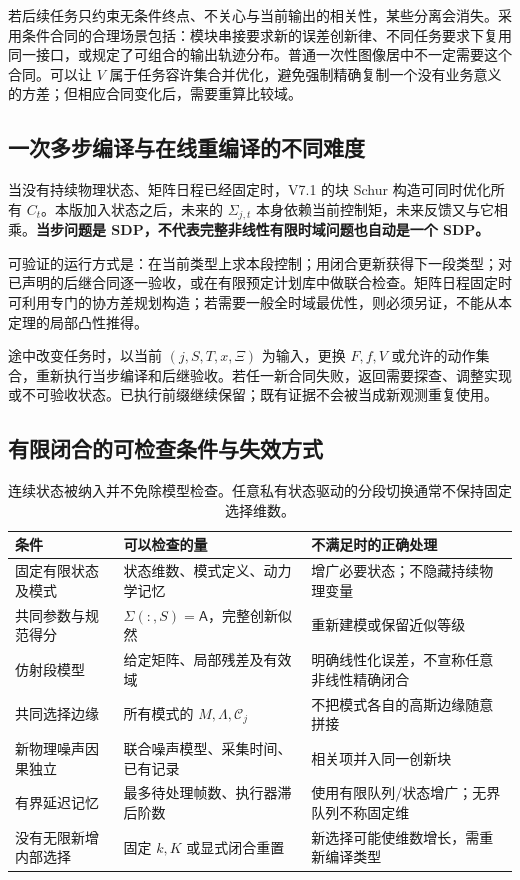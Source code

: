 \documentclass[UTF8,fontset=fandol,zihao=5,a4paper]{ctexart}
\theoremstyle{definition}
\theoremstyle{remark}\newtheorem{remark}[theorem]{说明}
\numberwithin{equation}{section}
\begin{document}
若后续任务只约束无条件终点、不关心与当前输出的相关性，某些分离会消失。采用条件合同的合理场景包括：模块串接要求新的误差创新律、不同任务要求下复用同一接口，或规定了可组合的输出轨迹分布。普通一次性图像居中不一定需要这个合同。可以让 $V$ 属于任务容许集合并优化，避免强制精确复制一个没有业务意义的方差；但相应合同变化后，需要重算比较域。

\subsection{一次多步编译与在线重编译的不同难度}
当没有持续物理状态、矩阵日程已经固定时，V7.1 的块 Schur 构造可同时优化所有 $C_t$。本版加入状态之后，未来的 $\Sigma_{j,t}$ 本身依赖当前控制矩，未来反馈又与它相乘。\textbf{当步问题是 SDP，不代表完整非线性有限时域问题也自动是一个 SDP。}

可验证的运行方式是：在当前类型上求本段控制；用闭合更新获得下一段类型；对已声明的后继合同逐一验收，或在有限预定计划库中做联合检查。矩阵日程固定时可利用专门的协方差规划构造；若需要一般全时域最优性，则必须另证，不能从本定理的局部凸性推得。

途中改变任务时，以当前 $(j,S,T,x,\Xi)$ 为输入，更换 $F,f,V$ 或允许的动作集合，重新执行当步编译和后继验收。若任一新合同失败，返回需要探查、调整实现或不可验收状态。已执行前缀继续保留；既有证据不会被当成新观测重复使用。

\subsection{有限闭合的可检查条件与失效方式}
\begin{table}[ht]\centering\small
\begin{tabularx}{\linewidth}{p{.25\linewidth}YY}
\toprule
条件 & 可以检查的量 & 不满足时的正确处理\\\midrule
固定有限状态及模式 & 状态维数、模式定义、动力学记忆 & 增广必要状态；不隐藏持续物理变量\\
共同参数与规范得分 & $\Sigma(:,S)=\mathsf A$，完整创新似然 & 重新建模或保留近似等级\\
仿射段模型 & 给定矩阵、局部残差及有效域 & 明确线性化误差，不宣称任意非线性精确闭合\\
共同选择边缘 & 所有模式的 $M,\Lambda,\mathcal C_j$ & 不把模式各自的高斯边缘随意拼接\\
新物理噪声因果独立 & 联合噪声模型、采集时间、已有记录 & 相关项并入同一创新块\\
有界延迟记忆 & 最多待处理帧数、执行器滞后阶数 & 使用有限队列/状态增广；无界队列不称固定维\\
没有无限新增内部选择 & 固定 $k,K$ 或显式闭合重置 & 新选择可能使维数增长，需重新编译类型\\
\bottomrule
\end{tabularx}
\caption{连续状态被纳入并不免除模型检查。任意私有状态驱动的分段切换通常不保持固定选择维数。}
\end{table}
\end{document}
